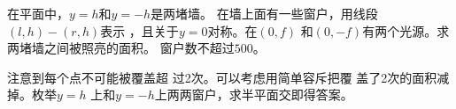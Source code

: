 \begin{prob}
	在平面中，$y=h$和$y=-h$是两堵墙。
	在墙上面有一些窗户，用线段$(l,h)-(r,h)$表示
	，且关于$y=0$对称。在$(0,f)$
	和$(0,-f)$有两个光源。求两堵墙之间被照亮的面积。
	窗户数不超过$500$。
\end{prob}

\begin{sol}
	注意到每个点不可能被覆盖超
	过2次。可以考虑用简单容斥把覆
	盖了2次的面积减掉。枚举$y=h$
	上和$y=-h$上两两窗户，求半平面交即得答案。
\end{sol}
